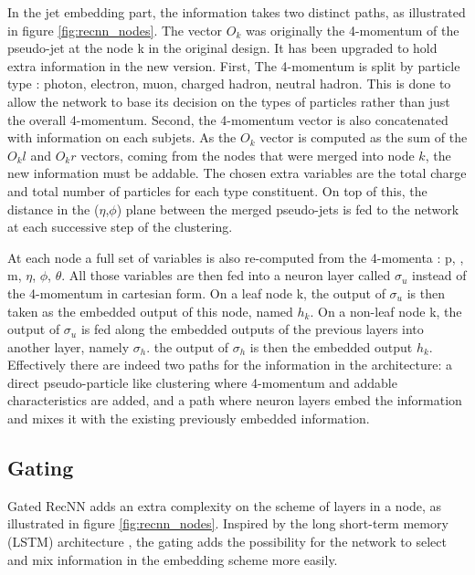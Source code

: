 In the jet embedding part, the information takes two distinct paths, as illustrated in figure \ref{fig:recnn_nodes}.
The vector $O_k$ was originally the 4-momentum of the pseudo-jet at the node k in the original design. It has been upgraded to hold extra information in the new version. First, The 4-momentum is split by particle type : photon, electron, muon, charged hadron, neutral hadron. This is done to allow the network to base its decision on the types of particles rather than just the overall 4-momentum. Second, the 4-momentum vector is also concatenated with information on each subjets. As the $O_k$ vector is computed as the sum of the $O_kl$ and $O_kr$ vectors, coming from the nodes that were merged into node $k$, the new information must be addable. The chosen extra variables are the total charge and total number of particles for each type constituent. On top of this, the distance in the ($\eta$,$\phi$) plane between the merged pseudo-jets is fed to the network at each successive step of the clustering. 

At each node a full set of variables is also re-computed from the 4-momenta : p, \pt, m, $\eta$, $\phi$, $\theta$. All those variables are then fed into a neuron layer called $\sigma_{u}$ instead of the 4-momentum in cartesian form.
On a leaf node k, the output of $\sigma_{u}$ is then taken as the embedded output of this node, named $h_k$.
On a non-leaf node k, the output of $\sigma_{u}$ is fed along the embedded outputs of the previous layers into another layer, namely $\sigma_h$. the output of $\sigma_h$ is then the embedded output $h_k$.
Effectively there are indeed two paths for the information in the architecture: a direct pseudo-particle like clustering where 4-momentum and addable characteristics are added, and a path where neuron layers embed the information and mixes it with the existing previously embedded information.

\subsection{Gating}

Gated RecNN adds an extra complexity on the scheme of layers in a node, as illustrated in figure \ref{fig:recnn_nodes}. Inspired by the long short-term memory (LSTM) architecture \cite{lstm}, the gating adds the possibility for the network to select and mix information in the embedding scheme more easily. 


